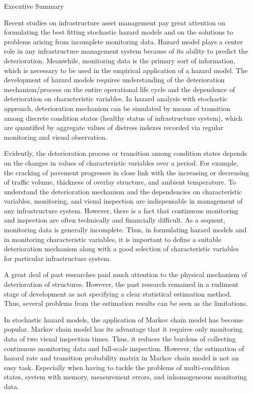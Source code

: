 \begin{center}
    {\huge{Executive Summary} \par}
    \end{center}
  \vfil\vfil
Recent studies on infrastructure asset management pay great attention on formulating the best fitting stochastic hazard models and on the solutions to problems arising from incomplete monitoring data. Hazard model plays a center role in any infrastructure management system because of its ability to predict the deterioration. Meanwhile, monitoring data is the primary sort of information, which is necessary to be used in the empirical application of a hazard model. The development of hazard models requires  understanding of the deterioration mechanism/process on the entire operational life cycle and the dependence of deterioration on characteristic variables. In hazard analysis with stochastic approach, deterioration mechanism can be simulated by means of transition among  discrete condition states (healthy status of infrastructure system), which are quantified by aggregate values of distress indexes recorded via regular monitoring and visual observation.

Evidently, the deterioration process or transition among condition states depends on the changes in values of characteristic variables over a period. For example, the cracking of pavement progresses in close link with the increasing or decreasing of traffic volume, thickness of overlay structure, and ambient temperature. To understand the deterioration mechanism and the dependencies on characteristic variables, monitoring, and visual inspection are indispensable in management of any infrastructure system. However, there is a fact that continuous monitoring and inspection are often technically and financially difficult. As a sequent, monitoring data is generally incomplete. Thus, in formulating  hazard models and in monitoring characteristic variables, it is important to define a suitable deterioration mechanism along with a good selection of characteristic variables for particular infrastructure system.

A great deal of past researches paid much attention to the physical mechanism of deterioration of structures. However, the past research remained in a rudiment stage of development as not specifying a clear statistical estimation method. Thus, several problems from the estimation results can be seen as the limitations. 

In stochastic hazard models, the application of Markov chain model has become popular. Markov chain model has its advantage that it requires only monitoring data of two visual inspection times. Thus, it reduces the burdens of collecting continuous monitoring data and full-scale inspection. However, the estimation of hazard rate and transition probability matrix in Markov chain model is not an easy task. Especially when having to tackle the problems of multi-condition states, system with memory, measurement errors, and inhomogeneous monitoring data.

